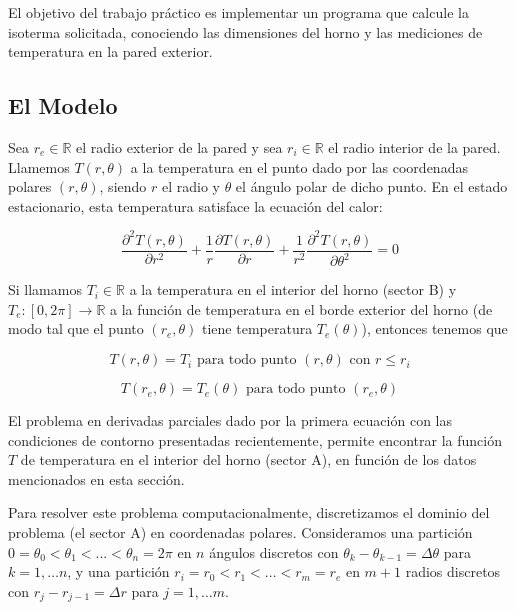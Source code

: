 \documentclass[11pt, a4paper, spanish]{article}
\theoremstyle{plain}
\theoremstyle{remark}
\begin{document}
\begin{appendices}
      El objetivo del trabajo práctico es implementar un programa que calcule la isoterma solicitada, conociendo las dimensiones del horno y las mediciones de temperatura en la pared exterior.

    \subsection{El Modelo}

      Sea $r_e \in \mathbb{R}$ el radio exterior de la pared y sea $r_i \in \mathbb{R}$ el radio interior de la pared. Llamemos $T(r, \theta)$ a la temperatura en el punto dado por las coordenadas polares $(r, \theta)$, siendo $r$ el radio y $\theta$ el ángulo polar de dicho punto. En el estado estacionario, esta temperatura satisface la ecuación del calor:

      \begin{equation} \label{eq:en1}
        \frac{\partial^2 T(r, \theta)}{\partial r^2} + \frac{1}{r} \frac{\partial T(r, \theta)}{\partial r} + \frac{1}{r^2} \frac{\partial^2 T(r, \theta)}{\partial \theta^2} = 0
      \end{equation}

      Si llamamos $T_i \in \mathbb{R}$ a la temperatura en el interior del horno (sector B) y $T_e : [0, 2\pi] \to \mathbb{R}$ a la función de temperatura en el borde exterior del horno (de modo tal que el punto $(r_e, \theta)$ tiene temperatura $T_e(\theta)$), entonces tenemos que

      \begin{equation} \label{eq:en2}
        T(r, \theta) = T_i \text{ para todo punto } (r, \theta) \text{ con } r \leq r_i
      \end{equation}

      \begin{equation} \label{eq:en3}
        T(r_e, \theta) = T_e(\theta) \text{ para todo punto } (r_e, \theta)
      \end{equation}

      El problema en derivadas parciales dado por la primera ecuación con las condiciones de contorno presentadas recientemente, permite encontrar la función $T$ de temperatura en el interior del horno (sector A), en función de los datos mencionados en esta sección.

      Para resolver este problema computacionalmente, discretizamos el dominio del problema (el sector A) en coordenadas polares. Consideramos una partición $0 = \theta_0 < \theta_1 < ... < \theta_n = 2\pi$ en $n$ ángulos discretos con $\theta_k - \theta_{k-1} = \Delta \theta$ para $k = 1, \dots n$, y una partición $r_i = r_0 < r_1 < ... < r_m = r_e$ en $m + 1$ radios discretos con $r_j - r_{j-1} = \Delta r$ para $j = 1, \dots m$.


\end{appendices}
\end{document}
